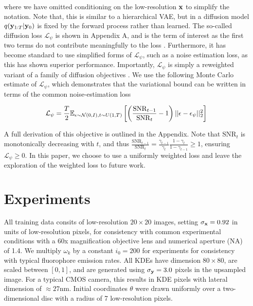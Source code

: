 \documentclass{article}
\begin{document}
where we have omitted conditioning on the low-resolution $\bold{x}$ to simplify the notation. Note that, this is similar to a hierarchical VAE, but in a diffusion model $q(\bold{y}_{1:T}|\bold{y}_{0})$ is fixed by the forward process rather than learned. The so-called diffusion loss $\mathcal{L}_{\psi}$ is shown in Appendix A, and is the term of interest as the first two terms do not contribute meaningfully to the loss \citep{Ho2020}. Furthermore, it has become standard to use simplified forms of $\mathcal{L}_{\psi}$, such as a noise estimation loss, as this has shown superior performance. Importantly, $\mathcal{L}_{\psi}$ is simply a reweighted variant of a family of diffusion objectives \citep{Kingma2021,Kingma2023}. We use the following Monte Carlo estimate of $\mathcal{L}_{\psi}$, which demonstrates that the variational bound can be written in terms of the common noise-estimation loss


\begin{equation}
\mathcal{L}_{\psi} = \frac{T}{2}\mathbb{E}_{\epsilon\sim \mathcal{N}(0,I),t\sim U(1,T)}\left[\left(\frac{\mathrm{SNR}_{t-1}}{{\mathrm{SNR}_{t}}}-1\right)\lvert\lvert \bold{\epsilon}-\bold{\epsilon}_{\psi}\lvert\lvert_{2}^{2}\right]
\end{equation}

A full derivation of this objective is outlined in the Appendix. Note that $\mathrm{SNR}_{t}$ is monotonically decreasing with $t$, and thus $\frac{\mathrm{SNR}_{t-1}}{{\mathrm{SNR}_{t}}} = \frac{\gamma_{t-1}}{\gamma_{t}}\frac{1-\gamma_{t}}{1-\gamma_{t-1}} \geq 1$, ensuring $\mathcal{L}_{\psi}\geq 0$. In this paper, we choose to use a uniformly weighted loss and leave the exploration of the weighted loss to future work.

\section{Experiments}

All training data consits of low-resolution $20\times 20$ images, setting $\sigma_{\bold{x}}=0.92$ in units of low-resolution pixels, for consistency with common experimental conditions with a 60x magnification objective lens and numerical aperture (NA) of 1.4. We multiply $\omega_{k}$ by a constant $i_{0}=200$ for experiments for consistency with typical fluorophore emission rates. All KDEs have dimension $80\times 80$, are scaled between $[0,1]$, and are generated using $\sigma_{\bold{y}}=3.0$ pixels in the upsampled image. For a typical CMOS camera, this results in KDE pixels with lateral dimension of $\approx 27\mathrm{nm}$. Initial coordinates $\theta$ were drawn uniformly over a two-dimensional disc with a radius of 7 low-resolution pixels.
\end{document}
